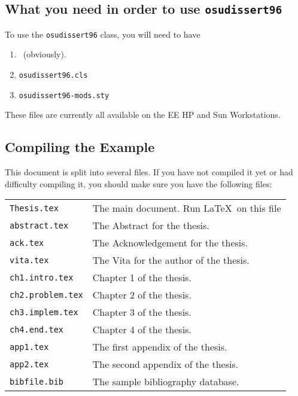 \subsection{What you need in order to use {\tt osudissert96}}

To use the {\tt osudissert96} class, you will need to have
%
\begin{enumerate}
\item \LaTeXe\ (obviously).
\item {\tt osudissert96.cls}
\item {\tt osudissert96-mods.sty}
\end{enumerate}
These files are currently all available on the EE HP and Sun Workstations.
%

\subsection{Compiling the Example}
\label{compile.example}

This document is split into several files.  If you have not compiled
it yet or had difficulty compiling it, you should make sure you have
the following files:
%
\begin{center}
\begin{tabular}{l l}
{\tt Thesis.tex} & The main document. Run \LaTeX\ on this file\\
{\tt abstract.tex} & The Abstract for the thesis.\\
{\tt ack.tex} & The Acknowledgement for the thesis.\\
{\tt vita.tex} & The Vita for the author of the thesis.\\
{\tt ch1.intro.tex} & Chapter 1 of the thesis.\\
{\tt ch2.problem.tex} & Chapter 2 of the thesis.\\
{\tt ch3.implem.tex} & Chapter 3 of the thesis.\\
{\tt ch4.end.tex} & Chapter 4 of the thesis.\\
{\tt app1.tex} & The first appendix of the thesis.\\
{\tt app2.tex} & The second appendix of the thesis.\\
{\tt bibfile.bib} & The sample bibliography database.
\end{tabular}
\end{center}
%

